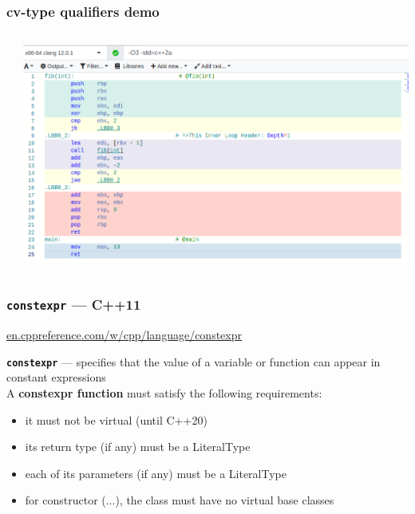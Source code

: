 \documentclass[aspectratio=169]{beamer}
\newcommand{\cpp}[1]{\texttt{\textbf{\textcolor{clCodeBlue}{#1}}}}
\begin{document}
\begin{frame}
\frametitle{cv-type qualifiers demo}
  \begin{columns}
    \begin{column}{0.45\textwidth}
      {\fontsize{8}{8} }
    \end{column}
    \begin{column}{0.55\textwidth}
      \includegraphics[width=\textwidth]{pics/01_cvspec_assembly}
    \end{column}
  \end{columns}
\end{frame}


\begin{frame}
\frametitle{\cpp{constexpr} --- C++11}
\href{https://en.cppreference.com/w/cpp/language/constexpr}{en.cppreference.com/w/cpp/language/constexpr}\\ \vspace{12pt}
{\footnotesize
\cpp{constexpr} --- specifies that the value of a variable or function can appear in constant expressions\\ \vspace{6pt}
A \textbf{constexpr function} must satisfy the following requirements:
  \begin{itemize}
    \item{it must not be virtual \textcolor{clGreen}{(until C++20)}}
    \item{its return type (if any) must be a LiteralType}
    \item{each of its parameters (if any) must be a LiteralType}
    \item{for constructor (...), the class must have no virtual base classes}
  \end{itemize}
}
\end{frame}
\end{document}
